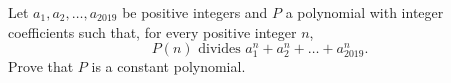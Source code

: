 Let $a_1, a_2, \dots, a_{2019}$ be positive integers and $P$ a polynomial with integer coefficients such that, for every positive integer $n$, $$P(n) \text{ divides  } a_1^n+a_2^n+\dots+a_{2019}^n.$$Prove that $P$ is a constant polynomial.